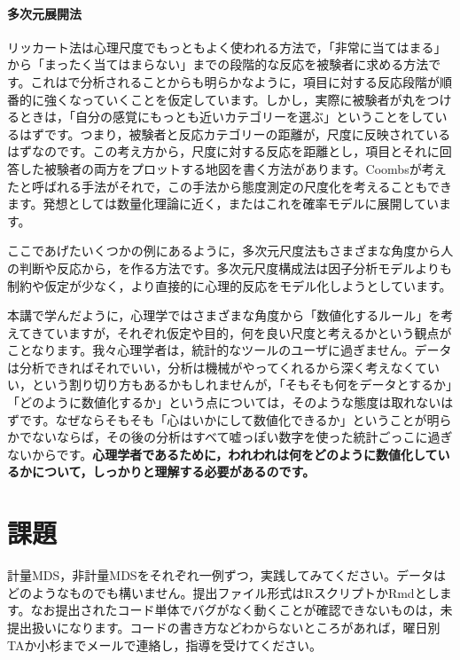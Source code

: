 \documentclass{ltjsbook}
\begin{document}
\paragraph{多次元展開法}リッカート法は心理尺度でもっともよく使われる方法で，「非常に当てはまる」から「まったく当てはまらない」までの段階的な反応を被験者に求める方法です。これはで分析されることからも明らかなように，項目に対する反応段階が順番的に強くなっていくことを仮定しています。しかし，実際に被験者が丸をつけるときは，「自分の感覚にもっとも近いカテゴリーを選ぶ」ということをしているはずです。つまり，被験者と反応カテゴリーの距離が，尺度に反映されているはずなのです。この考え方から，尺度に対する反応を距離とし，項目とそれに回答した被験者の両方をプロットする地図を書く方法があります。Coombsが考えたと呼ばれる手法がそれで，この手法から態度測定の尺度化を考えることもできます。発想としては数量化理論に近く，また\citet{shimizu2018}はこれを確率モデルに展開しています。

ここであげたいくつかの例にあるように，多次元尺度法もさまざまな角度から人の判断や反応から，を作る方法です。多次元尺度構成法は因子分析モデルよりも制約や仮定が少なく，より直接的に心理的反応をモデル化しようとしています。

本講で学んだように，心理学ではさまざまな角度から「数値化するルール」を考えてきていますが，それぞれ仮定や目的，何を良い尺度と考えるかという観点がことなります。我々心理学者は，統計的なツールのユーザに過ぎません。データは分析できればそれでいい，分析は機械がやってくれるから深く考えなくていい，という割り切り方もあるかもしれませんが，「そもそも何をデータとするか」「どのように数値化するか」という点については，そのような態度は取れないはずです。なぜならそもそも「心はいかにして数値化できるか」ということが明らかでないならば，その後の分析はすべて嘘っぽい数字を使った統計ごっこに過ぎないからです。\textbf{心理学者であるために，われわれは何をどのように数値化しているかについて，しっかりと理解する必要があるのです。}

\section{課題}
計量MDS，非計量MDSをそれぞれ一例ずつ，実践してみてください。データはどのようなものでも構いません。提出ファイル形式はRスクリプトかRmdとします。なお提出されたコード単体でバグがなく動くことが確認できないものは，未提出扱いになります。コードの書き方などわからないところがあれば，曜日別TAか小杉までメールで連絡し，指導を受けてください。
\end{document}
